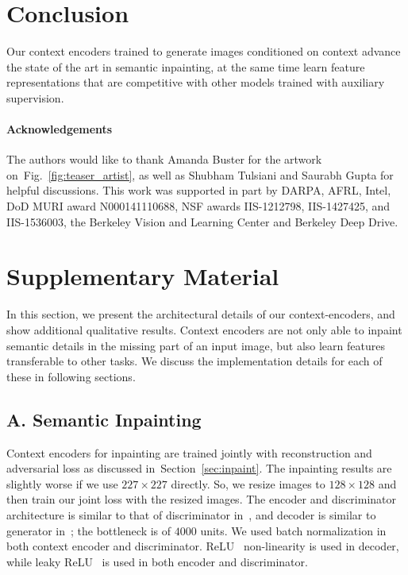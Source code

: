 \documentclass[10pt,twocolumn,letterpaper]{article}
\newcommand{\shortreffig}[1]{Fig.~\ref{fig:#1}}
\newcommand{\refsec}[1]{Section~\ref{sec:#1}}
\begin{document}
\section{Conclusion}
%
Our context encoders trained to generate images conditioned on context advance the state of the art in semantic inpainting,
at the same time learn feature representations that are competitive with other models trained with auxiliary supervision.

\paragraph{Acknowledgements}
The authors would like to thank Amanda Buster for the artwork on~\shortreffig{teaser_artist}, as well as Shubham Tulsiani and Saurabh Gupta for helpful discussions. This work was supported in part by DARPA, AFRL, Intel, DoD MURI award N000141110688, NSF awards  IIS-1212798, IIS-1427425, and IIS-1536003, the Berkeley Vision and Learning Center and Berkeley Deep Drive.

{\small


}

\section*{Supplementary Material}
In this section, we present the architectural details of our context-encoders, and show additional qualitative results.
Context encoders are not only able to inpaint semantic details in the missing part of an input image, but also learn features transferable to other tasks.
We discuss the implementation details for each of these in following sections.

\subsection*{A. Semantic Inpainting}
Context encoders for inpainting are trained jointly with reconstruction and adversarial loss as discussed in~\refsec{inpaint}.
The inpainting results are slightly worse if we use $227\times 227$ directly.
So, we resize images to $128\times 128$ and then train our joint loss with the resized images.
The encoder and discriminator architecture is similar to that of discriminator in~\cite{dcgan}, and decoder is similar to generator in~\cite{dcgan}; the bottleneck is of $4000$ units.
We used batch normalization in both context encoder and discriminator.
ReLU~\cite{krizhevsky2012imagenet} non-linearity is used in decoder, while leaky ReLU~\cite{dcgan} is used in both encoder and discriminator.
\end{document}
